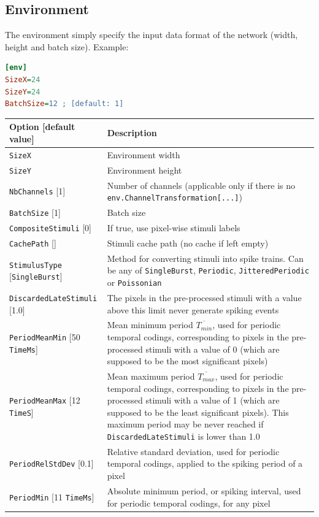 \documentclass[a4paper,11pt,oneside]{article}
\begin{document}
\subsection{Environment}

The environment simply specify the input data format of the network (width,
height and batch size). Example:
\begin{lstlisting}[language=ini]
[env]
SizeX=24
SizeY=24
BatchSize=12 ; [default: 1]
\end{lstlisting}


\begin{center}
 \begin{longtable}{| p{5cm} | p{10cm} | }
 \hline
 Option [default value] & Description\\
 \hline\hline
  \cellcolor{requiredcolor}
  \lstinline!SizeX! & Environment width \\
  \cellcolor{requiredcolor}
  \lstinline!SizeY! & Environment height \\
  \lstinline!NbChannels! [1] & Number of channels (applicable only if there is
   no \lstinline!env.ChannelTransformation[...]!) \\
  \lstinline!BatchSize! [1] & Batch size \\
  \lstinline!CompositeStimuli! [0] & If true, use pixel-wise stimuli labels \\
  \lstinline!CachePath! [] & Stimuli cache path (no cache if left empty) \\
  \hline
  \lstinline!StimulusType! [\lstinline!SingleBurst!] & Method for converting
  stimuli into spike trains. Can be any of \lstinline!SingleBurst!,
   \lstinline!Periodic!, \lstinline!JitteredPeriodic! or
   \lstinline!Poissonian! \\
  \lstinline!DiscardedLateStimuli! [1.0] & The pixels in the pre-processed
  stimuli with a value above this limit never generate spiking events \\
  \lstinline!PeriodMeanMin! [50 \lstinline!TimeMs!] & Mean minimum period
  $\overline{T_{min}}$, used for periodic temporal codings, corresponding to
  pixels in the pre-processed stimuli with a value of 0 (which are supposed to
   be the most significant pixels) \\
  \lstinline!PeriodMeanMax! [12 \lstinline!TimeS!] & Mean maximum period
  $\overline{T_{max}}$, used for periodic temporal codings, corresponding to
  pixels in the pre-processed stimuli with a value of 1 (which are supposed
  to be the least significant pixels). This maximum period may be never reached
   if \lstinline!DiscardedLateStimuli! is lower than 1.0 \\
  \lstinline!PeriodRelStdDev! [0.1] & Relative standard deviation, used for
  periodic temporal codings, applied to the spiking period of a pixel \\
  \lstinline!PeriodMin! [11 \lstinline!TimeMs!] & Absolute minimum period,
  or spiking interval, used for periodic temporal codings, for any pixel \\
 \hline
\end{longtable}
\end{center}
\end{document}
